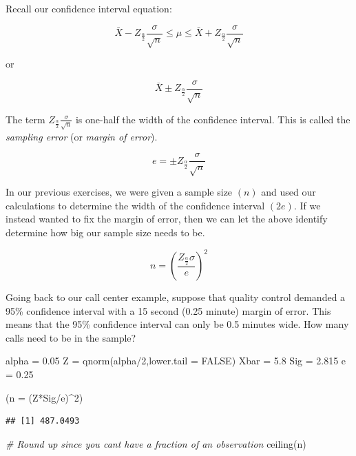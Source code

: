 \documentclass[
]{book}
\newenvironment{Shaded}{\begin{snugshade}}{\end{snugshade}}
\newcommand{\AttributeTok}[1]{\textcolor[rgb]{0.77,0.63,0.00}{#1}}
\newcommand{\CommentTok}[1]{\textcolor[rgb]{0.56,0.35,0.01}{\textit{#1}}}
\newcommand{\ConstantTok}[1]{\textcolor[rgb]{0.00,0.00,0.00}{#1}}
\newcommand{\DecValTok}[1]{\textcolor[rgb]{0.00,0.00,0.81}{#1}}
\newcommand{\FloatTok}[1]{\textcolor[rgb]{0.00,0.00,0.81}{#1}}
\newcommand{\FunctionTok}[1]{\textcolor[rgb]{0.00,0.00,0.00}{#1}}
\newcommand{\NormalTok}[1]{#1}
\newcommand{\OtherTok}[1]{\textcolor[rgb]{0.56,0.35,0.01}{#1}}
\newcommand{\SpecialCharTok}[1]{\textcolor[rgb]{0.00,0.00,0.00}{#1}}
\begin{document}
Recall our confidence interval equation:

\[\bar{X}-Z_{\frac{\alpha}{2}}\frac{\sigma}{\sqrt{n}} \leq \mu \leq \bar{X}+Z_{\frac{\alpha}{2}}\frac{\sigma}{\sqrt{n}}\]

or

\[\bar{X} \pm Z_{\frac{\alpha}{2}}\frac{\sigma}{\sqrt{n}}\]

The term \(Z_{\frac{\alpha}{2}}\frac{\sigma}{\sqrt{n}}\) is one-half the width of the confidence interval. This is called the \emph{sampling error} (or \emph{margin of error}).

\[e = \pm Z_{\frac{\alpha}{2}}\frac{\sigma}{\sqrt{n}}\]

In our previous exercises, we were given a sample size \((n)\) and used our calculations to determine the width of the confidence interval \((2e)\). If we instead wanted to fix the margin of error, then we can let the above identify determine how big our sample size needs to be.

\[n = \left( \frac{Z_{\frac{\alpha}{2}}\sigma}{e}\right)^2\]

Going back to our call center example, suppose that quality control demanded a 95\% confidence interval with a 15 second (0.25 minute) margin of error. This means that the 95\% confidence interval can only be 0.5 minutes wide. How many calls need to be in the sample?

\begin{Shaded}
\begin{Highlighting}[]
\NormalTok{alpha }\OtherTok{=} \FloatTok{0.05}
\NormalTok{Z }\OtherTok{=} \FunctionTok{qnorm}\NormalTok{(alpha}\SpecialCharTok{/}\DecValTok{2}\NormalTok{,}\AttributeTok{lower.tail =} \ConstantTok{FALSE}\NormalTok{)}
\NormalTok{Xbar }\OtherTok{=} \FloatTok{5.8}
\NormalTok{Sig }\OtherTok{=} \FloatTok{2.815}
\NormalTok{e }\OtherTok{=} \FloatTok{0.25}

\NormalTok{(}\AttributeTok{n =}\NormalTok{ (Z}\SpecialCharTok{*}\NormalTok{Sig}\SpecialCharTok{/}\NormalTok{e)}\SpecialCharTok{\^{}}\DecValTok{2}\NormalTok{)}
\end{Highlighting}
\end{Shaded}

\begin{verbatim}
## [1] 487.0493
\end{verbatim}

\begin{Shaded}
\begin{Highlighting}[]
\CommentTok{\# Round up since you can\textquotesingle{}t have a fraction of an observation}
\FunctionTok{ceiling}\NormalTok{(n)}
\end{Highlighting}
\end{Shaded}
\end{document}
